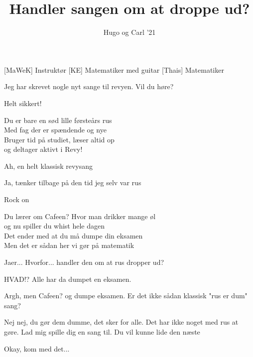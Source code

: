 \documentclass[a4paper,11pt]{article}
\title{Handler sangen om at droppe ud?}
\author{Hugo og Carl '21}
\begin{document}
\maketitle

\begin{roles}
[MaWeK] Instruktør
[KE] Matematiker med guitar
[Thais] Matematiker
\end{roles}


\begin{sketch}




 Jeg har skrevet nogle nyt sange til revyen. Vil du høre?

 Helt sikkert! 


 Du er bare en sød lille førsteårs rus\\
			Med fag der er spændende og nye\\
			Bruger tid på studiet, læser altid op\\
			og deltager aktivt i Revy!
			
 Ah, en helt klassisk revysang

 Ja, tænker tilbage på den tid jeg selv var rus

 Rock on

 Du lærer om Cafeen? Hvor man drikker mange øl\\
			og nu spiller du whist hele dagen\\
			Det ender med at du må dumpe din eksamen\\
			Men det er sådan her vi gør på matematik

 Jaer... Hvorfor... handler den om at rus dropper ud?

 HVAD!? Alle har da dumpet en eksamen.

 Argh, men Cafeen? og dumpe eksamen. Er det ikke sådan klassisk "rus er dum" sang?

 Nej nej, du gør dem dumme, det sker for alle. Det har ikke noget med rus at gøre. Lad mig spille dig en sang til. Du vil kunne lide den næste

 Okay, kom med det...


\end{sketch}
\end{document}

